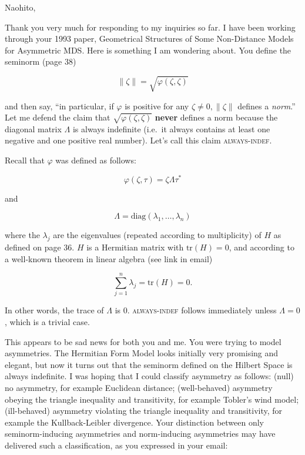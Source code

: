 \documentclass[landscape,12pt]{article}
\begin{document}
Naohito,

Thank you very much for responding to my inquiries so far. I have been
working through your 1993 paper, Geometrical Structures of Some
Non-Distance Models for Asymmetric MDS. Here is something I am
wondering about. You define the seminorm (page 38)

\begin{equation}
  \label{eq:n1}
  \|\zeta\|=\sqrt{\varphi(\zeta,\zeta)}
\end{equation}

and then say, ``in particular, if $\varphi$ is positive for any
$\zeta\neq{}0,\|\zeta\|$ defines a \emph{norm}.'' Let me defend the
claim that $\sqrt{\varphi(\zeta,\zeta)}$ \textbf{never} defines a norm
because the diagonal matrix $\Lambda$ is always indefinite (i.e.\ it
always contains at least one negative and one positive real number).
Let's call this claim \textsc{always-indef}.

Recall that $\varphi$ was defined as follows:

\begin{equation}
  \label{eq:n2}
  \varphi(\zeta,\tau)=\zeta\Lambda\tau^{*}
\end{equation}

and 

\begin{equation}
  \label{eq:n3}
  \Lambda=\mbox{diag}(\lambda_{1},\ldots,\lambda_{n})
\end{equation}

where the $\lambda_{j}$ are the eigenvalues (repeated according to
multiplicity) of $H$ as defined on page 36. $H$ is a Hermitian matrix
with $\mbox{tr}(H)=0$, and according to a well-known theorem in linear
algebra (see link in email)

\begin{equation}
  \label{eq:n4}
  \sum_{j=1}^{n}\lambda_{j}=\mbox{tr}(H)=0.
\end{equation}

In other words, the trace of $\Lambda$ is $0$. \textsc{always-indef}
follows immediately unless $\Lambda=0$, which is a trivial case.

This appears to be sad news for both you and me. You were trying to
model asymmetries. The Hermitian Form Model looks initially very
promising and elegant, but now it turns out that the seminorm defined
on the Hilbert Space is always indefinite. I was hoping that I could
classify asymmetry as follows: (null) no asymmetry, for example
Euclidean distance; (well-behaved) asymmetry obeying the triangle
inequality and transitivity, for example Tobler's wind model;
(ill-behaved) asymmetry violating the triangle inequality and
transitivity, for example the Kullback-Leibler divergence. Your
distinction between only seminorm-inducing asymmetries and
norm-inducing asymmetries may have delivered such a classification, as
you expressed in your email:
\end{document}
